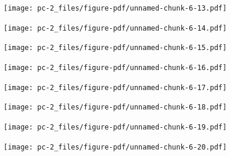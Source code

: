 \documentclass[
  letterpaper,
  DIV=11,
  numbers=noendperiod]{scrreprt}
\begin{document}
\begin{figure}[H]

{\centering \texttt{[image: pc-2\_files/figure-pdf/unnamed-chunk-6-13.pdf]}

}

\end{figure}

\begin{figure}[H]

{\centering \texttt{[image: pc-2\_files/figure-pdf/unnamed-chunk-6-14.pdf]}

}

\end{figure}

\begin{figure}[H]

{\centering \texttt{[image: pc-2\_files/figure-pdf/unnamed-chunk-6-15.pdf]}

}

\end{figure}

\begin{figure}[H]

{\centering \texttt{[image: pc-2\_files/figure-pdf/unnamed-chunk-6-16.pdf]}

}

\end{figure}

\begin{figure}[H]

{\centering \texttt{[image: pc-2\_files/figure-pdf/unnamed-chunk-6-17.pdf]}

}

\end{figure}

\begin{figure}[H]

{\centering \texttt{[image: pc-2\_files/figure-pdf/unnamed-chunk-6-18.pdf]}

}

\end{figure}

\begin{figure}[H]

{\centering \texttt{[image: pc-2\_files/figure-pdf/unnamed-chunk-6-19.pdf]}

}

\end{figure}

\begin{figure}[H]

{\centering \texttt{[image: pc-2\_files/figure-pdf/unnamed-chunk-6-20.pdf]}

}

\end{figure}
\end{document}
